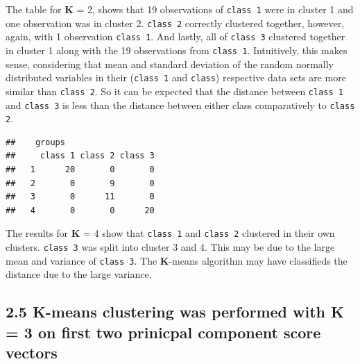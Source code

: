\documentclass[]{article}
\newenvironment{Shaded}{\begin{snugshade}}{\end{snugshade}}
\newcommand{\KeywordTok}[1]{\textcolor[rgb]{0.13,0.29,0.53}{\textbf{{#1}}}}
\newcommand{\DataTypeTok}[1]{\textcolor[rgb]{0.13,0.29,0.53}{{#1}}}
\newcommand{\DecValTok}[1]{\textcolor[rgb]{0.00,0.00,0.81}{{#1}}}
\newcommand{\StringTok}[1]{\textcolor[rgb]{0.31,0.60,0.02}{{#1}}}
\newcommand{\NormalTok}[1]{{#1}}
\begin{document}
The table for \textbf{K} = 2, shows that 19 observations of
\texttt{class 1} were in cluster 1 and one observation was in cluster 2.
\texttt{class 2} correctly clustered together, however, again, with 1
observation \texttt{class 1}. And lastly, all of \texttt{class 3}
clustered together in cluster 1 along with the 19 observations from
\texttt{class 1}. Intuitively, this makes sense, considering that mean
and standard deviation of the random normally distributed variables in
their (\texttt{class 1} and \texttt{class}) respective data sets are
more similar than \texttt{class 2}. So it can be expected that the
distance between \texttt{class 1} and \texttt{class 3} is less than the
distance between either class comparatively to \texttt{class 2}.

\begin{Shaded}
\end{Shaded}

\begin{verbatim}
##    groups
##     class 1 class 2 class 3
##   1      20       0       0
##   2       0       9       0
##   3       0      11       0
##   4       0       0      20
\end{verbatim}

The results for \textbf{K} = 4 show that \texttt{class 1} and
\texttt{class 2} clustered in their own clusters. \texttt{class 3} was
split into cluster 3 and 4. This may be due to the large mean and
variance of \texttt{class 3}. The \textbf{K}-means algorithm may have
classifieds the distance due to the large variance.

\subsection{2.5 \textbf{K}-means clustering was performed with
\textbf{K} = 3 on first two prinicpal component score
vectors}\label{k-means-clustering-was-performed-with-k-3-on-first-two-prinicpal-component-score-vectors}

\begin{Shaded}
\end{Shaded}
\end{document}
